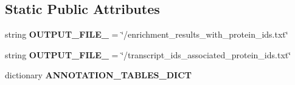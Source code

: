 \subsection*{Static Public Attributes}
\begin{DoxyCompactItemize}
\item 
\hypertarget{classsrc_1_1fr_1_1tagc_1_1rainet_1_1core_1_1execution_1_1analysis_1_1EnrichmentAnalysis_1_1Enric6c627eb5bd04b7c51c1ec93bc189786a_a5beeb137b8d3dd53c1c15130e4f446db}{string {\bfseries O\-U\-T\-P\-U\-T\-\_\-\-F\-I\-L\-E\-\_} = \char`\"{}/enrichment\-\_\-results\-\_\-with\-\_\-protein\-\_\-ids.\-txt\char`\"{}}\label{classsrc_1_1fr_1_1tagc_1_1rainet_1_1core_1_1execution_1_1analysis_1_1EnrichmentAnalysis_1_1Enric6c627eb5bd04b7c51c1ec93bc189786a_a5beeb137b8d3dd53c1c15130e4f446db}

\item 
\hypertarget{classsrc_1_1fr_1_1tagc_1_1rainet_1_1core_1_1execution_1_1analysis_1_1EnrichmentAnalysis_1_1Enric6c627eb5bd04b7c51c1ec93bc189786a_a758cd20688656a2777b887bef997b8db}{string {\bfseries O\-U\-T\-P\-U\-T\-\_\-\-F\-I\-L\-E\-\_} = \char`\"{}/transcript\-\_\-ids\-\_\-associated\-\_\-protein\-\_\-ids.\-txt\char`\"{}}\label{classsrc_1_1fr_1_1tagc_1_1rainet_1_1core_1_1execution_1_1analysis_1_1EnrichmentAnalysis_1_1Enric6c627eb5bd04b7c51c1ec93bc189786a_a758cd20688656a2777b887bef997b8db}

\item 
dictionary {\bfseries A\-N\-N\-O\-T\-A\-T\-I\-O\-N\-\_\-\-T\-A\-B\-L\-E\-S\-\_\-\-D\-I\-C\-T}
\end{DoxyCompactItemize}


